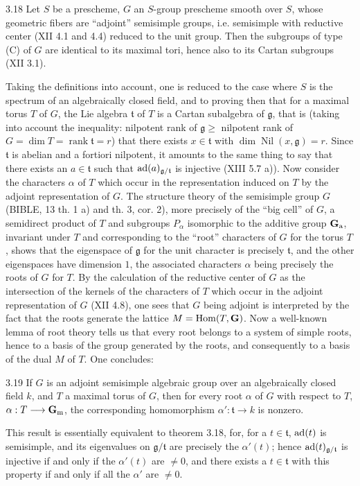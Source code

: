 \begin{theorem}{3.18}\label{XIV.3.18}
Let $S$ be a prescheme, $G$ an
$S$-group prescheme smooth over
$S$, whose geometric fibers
are ``adjoint'' semisimple
groups, i.e. semisimple with
reductive center (XII 4.1 and
4.4) reduced to the unit group.
Then the subgroups of type (C)
of $G$ are identical to its
maximal tori, hence also to
its Cartan subgroups (XII 3.1).
\end{theorem}
Taking the definitions into
account, one is reduced to the
case where $S$ is the spectrum
of an algebraically closed
field, and to proving then
that for a maximal torus $T$
of $G$, the Lie algebra
$\mathfrak t$ of $T$ is a
Cartan subalgebra of
$\mathfrak g$, that is
(taking into account the
inequality: nilpotent rank
of $\mathfrak g\geq$ nilpotent
rank of $G=\dim T=
\operatorname{rank}\mathfrak t=r$)
that there exists
$x\in\mathfrak t$ with
$\dim\operatorname{Nil}(x,\mathfrak g)=r$.
Since $\mathfrak t$ is
abelian and a fortiori
nilpotent, it amounts to
the same thing to say that
there exists an
$a\in\mathfrak t$ such
that $\operatorname{ad}(a)_{\mathfrak g/\mathfrak t}$
is injective (XIII 5.7 a)).
Now consider the characters
$\alpha$ of $T$ which occur
in the representation induced
on $T$ by the adjoint
representation of $G$.
The structure theory of the
semisimple group $G$ (BIBLE,
13 th. 1 a) and th. 3,
cor. 2), more precisely of
the ``big cell'' of $G$,
a semidirect product of
$T$ and subgroups $P_\alpha$
isomorphic to the additive
group $\mathbf{G}_{\mathrm{a}}$, invariant
under $T$ and corresponding
to the ``root'' characters
of $G$ for the torus $T$,
shows that the eigenspace
of $\mathfrak g$ for the
unit character is precisely
$\mathfrak t$, and the
other eigenspaces have
dimension $1$, the associated
characters $\alpha$ being
precisely the roots of $G$
for $T$. By the calculation
of the reductive center
of $G$ as the intersection
of the kernels of the
characters of $T$ which
occur in the adjoint
representation of $G$
(XII 4.8), one sees that
$G$ being adjoint is
interpreted by the fact
that the roots generate
the lattice
$M=\operatorname{Hom}(T,\mathbf G)$.
Now a well-known lemma
of root theory tells
us that every root
belongs to a system
of simple roots, hence
to a basis of the
group generated by the
roots, and consequently
to a basis of the
dual $M$ of $T$.
One concludes:

\begin{corollary}{3.19}\label{XIV.3.19}
If $G$ is an adjoint
semisimple algebraic group
over an algebraically
closed field $k$, and
$T$ a maximal torus
of $G$, then for every
root $\alpha$ of $G$
with respect to $T$,
$\alpha:T\longrightarrow\mathbf{G}_{\mathrm{m}}$, the
corresponding homomorphism
$\alpha':\mathfrak t\to k$
is nonzero.
\end{corollary}
This result is essentially
equivalent to theorem
3.18, for, for a
$t\in\mathfrak t$,
$\operatorname{ad}(t)$ is semisimple,
and its eigenvalues
on $\mathfrak g/\mathfrak t$
are precisely the
$\alpha'(t)$; hence
$\operatorname{ad}(t)_{\mathfrak g/\mathfrak t}$
is injective if and
only if the $\alpha'(t)$
are $\ne0$, and there
exists a $t\in\mathfrak t$
with this property if
and only if all the
$\alpha'$ are $\ne0$.

